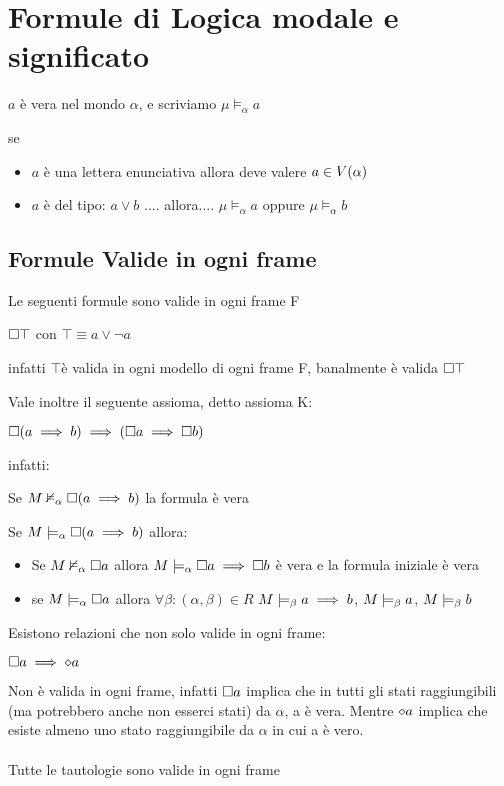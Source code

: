 
\chapter{Formule di Logica modale e significato}

$a$ è vera nel mondo $\alpha$, e scriviamo $\mu\models_{\alpha}a$

se 
\begin{itemize}
\item $a$ è una lettera enunciativa allora deve valere $a\in V(\alpha)$ 
\item $a$ è del tipo: $a\lor b$ .... allora.... $\mu\models_{\alpha}a$
oppure $\mu\models_{\alpha}b$ 
\end{itemize}

\section{Formule Valide in ogni frame}

Le seguenti formule sono valide in ogni frame F

$\square\top$ con $\top\equiv a\vee\neg a$ 

infatti $\top$è valida in ogni modello di ogni frame F, banalmente
è valida $\square\top$

Vale inoltre il seguente assioma, detto assioma K:

$\square(a\implies b)\implies(\square a\implies\square b)$

infatti:

Se $M\nvDash_{\alpha}\square(a\implies b)$ la formula è vera

Se $M\models_{\alpha}\square(a\implies b)$ allora:
\begin{itemize}
\item Se $M\nvDash_{\alpha}\square a$ allora $M\models_{\alpha}\square a\implies\square b$
è vera e la formula iniziale è vera
\item se $M\models_{\alpha}\square a$ allora $\forall\beta:(\alpha,\beta)\in R$
$M\models_{\beta}a\implies b$, $M\models_{\beta}a$, $M\models_{\beta}b$
\end{itemize}
Esistono relazioni che non solo valide in ogni frame:

$\square a\implies\diamond a$

Non è valida in ogni frame, infatti $\square a$ implica che in tutti gli
stati raggiungibili (ma potrebbero anche non esserci stati) da $\alpha$,
a è vera. Mentre $\diamond a$ implica che esiste almeno uno stato raggiungibile
da $\alpha$ in cui a è vero.\\
\\
Tutte le tautologie sono valide in ogni frame


